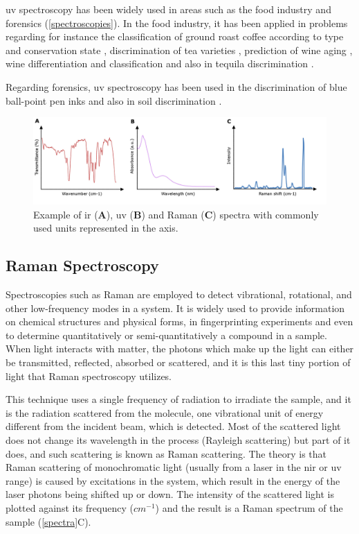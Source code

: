 \gls{uv} spectroscopy has been widely used in areas such as the food industry and forensics (\autoref{spectroscopies}). In the food industry, it has been applied in problems regarding for instance the classification of ground roast coffee according to type and conservation state \citep{souto2010uv}, discrimination of tea varieties \citep{kumar2013discrimination}, prediction of wine aging \citep{pereira2011madeira}, wine differentiation and classification \citep{urbano2006ultraviolet} and also in tequila discrimination \citep{barbosa2007uv}.

Regarding forensics, \gls{uv} spectroscopy has been used in the discrimination of blue ball-point pen inks \citep{thanasoulias2003multivariate} and also in soil discrimination \citep{thanasoulias2002application}.

\begin{figure}
	\centering
	\includegraphics[width=1.1\linewidth]{Imagens/spectroscopies}
	\caption{Example of \acrshort{ir} (\textbf{A}), \acrshort{uv} (\textbf{B}) and Raman (\textbf{C}) spectra with commonly used units represented in the axis.}
	\label{spectra}
\end{figure}

\subsection{Raman Spectroscopy}

Spectroscopies such as Raman are employed to detect vibrational, rotational, and other low-frequency modes in a system. It is widely used to provide information on chemical structures and physical forms, in fingerprinting experiments and even to determine quantitatively or semi-quantitatively a compound in a sample. When light interacts with matter, the photons which make up the light can either be transmitted, reflected, absorbed or scattered, and it is this last tiny portion of light that Raman spectroscopy utilizes.

This technique uses a single frequency of radiation to irradiate the sample, and it is the radiation scattered from the molecule, one vibrational unit of energy different from the incident beam, which is detected. Most of the scattered light does not change its wavelength in the process (Rayleigh scattering) but part of it does, and such scattering is known as Raman scattering. The theory is that Raman scattering of monochromatic light (usually from a laser in the \gls{nir} or \gls{uv} range) is caused by excitations in the system, which result in the energy of the laser photons being shifted up or down. The intensity of the scattered light is plotted against its frequency ($ cm^{-1} $) and the result is a Raman spectrum of the sample (\autoref{spectra}C).

